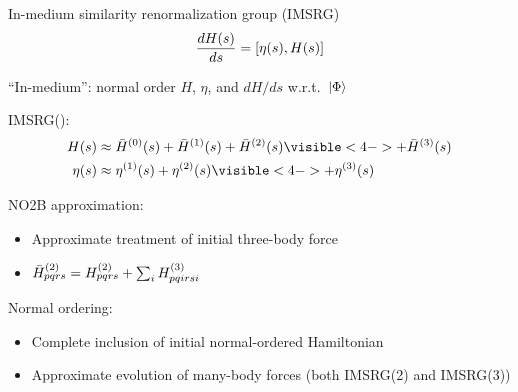 \documentclass[aspectratio=169]{beamer}
\begin{document}

\begin{frame}{In-medium similarity renormalization group (IMSRG) {}}
  \begin{equation*}
    \frac{dH(s)}{ds} = [\eta(s), H(s)]
  \end{equation*}

  ``In-medium'': normal order $H$, $\eta$, and $dH/ds$
  w.r.t.~$\ket{\Phi}$

  \pause
  IMSRG():
  \begin{align*}
    H(s)    & \approx \hnozero(s) + \hnoone(s) + \hnotwo(s) \visible<4->{+\hnothree(s)} \\
    \eta(s) & \approx \genone(s) + \gentwo(s) \visible<4->{+ \genthree(s)}
  \end{align*}
  \begin{overprint}
    NO2B approximation:
    \begin{itemize}
      \item Approximate treatment of initial three-body force
      \item ${\bar{H}}^{(2)}_{pqrs} = H^{(2)}_{pqrs} + \sum_{i} H^{(3)}_{pqirsi}$
    \end{itemize}
    Normal ordering:
    \begin{itemize}
      \item Complete inclusion of initial normal-ordered Hamiltonian
      \item Approximate evolution of many-body forces (both IMSRG(2) and IMSRG(3))
    \end{itemize}
  \end{overprint}
\end{frame}
\end{document}
